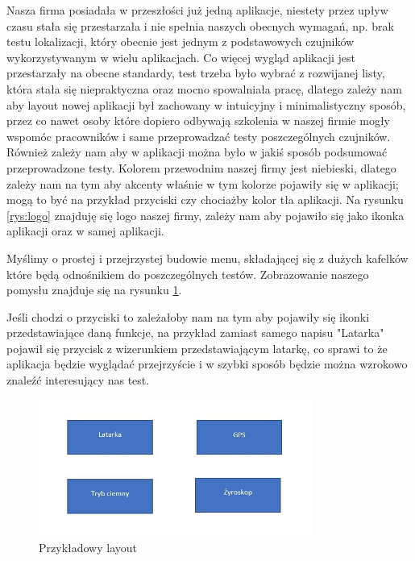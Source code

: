 \newpage

Nasza firma posiadała w przeszłości już jedną aplikacje, niestety przez upływ czasu stała się przestarzała i nie spełnia naszych obecnych wymagań, np. brak testu lokalizacji, który obecnie jest jednym z podstawowych czujników wykorzystywanym w wielu aplikacjach. Co więcej wygląd aplikacji jest przestarzały na obecne standardy, test trzeba było wybrać z rozwijanej listy, która stała się niepraktyczna oraz mocno spowalniała pracę, dlatego zależy nam aby layout nowej aplikacji był zachowany w intuicyjny i minimalistyczny sposób, przez co nawet osoby które dopiero odbywają szkolenia w naszej firmie mogły wspomóc pracowników i same przeprowadzać testy poszczególnych czujników. Również zależy nam aby w aplikacji można było w jakiś sposób podsumować przeprowadzone testy. Kolorem przewodnim naszej firmy jest niebieski, dlatego zależy nam na tym aby akcenty właśnie w tym kolorze pojawiły się w aplikacji; mogą to być na przykład przyciski czy chociażby kolor tła aplikacji. Na rysunku \ref{rys:logo} znajduję się logo naszej firmy, zależy nam aby pojawiło się jako ikonka aplikacji oraz w samej aplikacji. \newline 

Myślimy o prostej i przejrzystej budowie menu, składającej się z dużych kafelków które będą odnośnikiem do poszczególnych testów. Zobrazowanie naszego pomysłu znajduje się na rysunku \ref{rys:layout}. \newline

Jeśli chodzi o przyciski to zależałoby nam na tym aby pojawiły się ikonki przedstawiające daną funkcje, na przykład zamiast samego napisu "Latarka" pojawił się przycisk z wizerunkiem przedstawiającym latarkę, co sprawi to że aplikacja będzie wyglądać przejrzyście i w szybki sposób będzie można wzrokowo znaleźć interesujący nas test. 

\begin{figure}[!hbt]
	\begin{center}
		\includegraphics[angle=360, width=0.80\textwidth]{rys/punkt1/Layout_1.jpg}
		\caption{Przykładowy layout}
		\label{rys:layout}
	\end{center}
\end{figure}





  


 
 
 
 
 